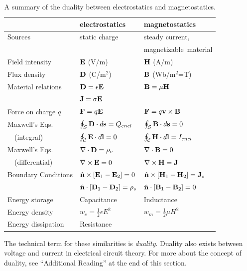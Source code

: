 \begin{table}[t]
\begin{center}
\begin{tabular}{lll}
~ & {\bf electrostatics} & {\bf magnetostatics} \\
\hline\hline
Sources & static charge  & steady current, \\
~ &                      & magnetizable~material \\
\hline
Field intensity & ${\bf E}$ (V/m)  & ${\bf H}$ (A/m) \\
Flux density    & ${\bf D}$ (C/m$^2$) & ${\bf B}$ (Wb/m$^2$=T) \\
\hline
Material relations & ${\bf D}=\epsilon{\bf E}$ & ${\bf B}=\mu{\bf H}$ \\
~                  & ${\bf J}=\sigma{\bf E}$ &  \\
\hline
Force on charge $q$ & ${\bf F}=q{\bf E}$ & ${\bf F}=q{\bf v} \times {\bf B}$ \\
\hline
Maxwell's Eqs. & $\oint_{\mathcal S}{{\bf D}\cdot d{\bf s}} = Q_{encl}$ & $\oint_{\mathcal S}{{\bf B}\cdot d{\bf s}} = 0$ \\
~~(integral)  & $\oint_{\mathcal C}{{\bf E}\cdot d{\bf l}} = 0$ & $\oint_{\mathcal C}{{\bf H}\cdot d{\bf l}} = I_{encl}$ \\
\hline
Maxwell's Eqs. & $\nabla\cdot{\bf D}=\rho_v$ & $\nabla\cdot{\bf B}=0$ \\
~~(differential)   & $\nabla\times{\bf E}=0$ & $\nabla\times{\bf H}={\bf J}$ \\
\hline
Boundary Conditions & $\hat{\bf n} \times \left[{\bf E}_1-{\bf E}_2\right] = 0$     & $\hat{\bf n} \times \left[{\bf H}_1-{\bf H}_2\right] = {\bf J}_s$ \\
~~                  & $\hat{\bf n} \cdot \left[{\bf D}_1-{\bf D}_2\right] = \rho_s$ & $\hat{\bf n} \cdot \left[{\bf B}_1-{\bf B}_2\right] = 0$ \\
\hline
Energy storage & Capacitance & Inductance \\
Energy density & $w_e=\frac{1}{2}\epsilon E^2$ & $w_m=\frac{1}{2}\mu H^2$ \\
Energy dissipation & Resistance &  \\
\hline
\end{tabular}
\end{center}
\label{m0115_tStaticsDuality}
\caption{A summary of the duality between electrostatics and magnetostatics.}
\end{table}

The technical term for these similarities is \emph{duality}.
Duality also exists between voltage and current in electrical circuit theory.
For more about the concept of duality, see ``Additional Reading'' at the end of this section.

